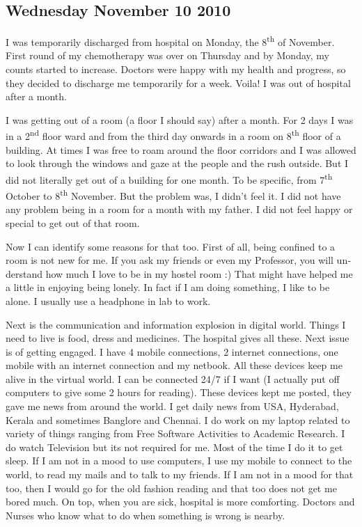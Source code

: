\begin{english}
\vskip 2pt
\subsection*{Wednesday November 10 2010}

I was temporarily discharged from hospital on Monday, the 8\textsuperscript{th} of November. First round of my chemotherapy 
was over on Thursday and by Monday, my counts started to increase. Doctors were happy with my health and 
progress, so they decided to discharge me temporarily for a week. Voila! I was out of hospital after a month. 

I was getting out of a room (a floor I should say) after a month. For 2 days I was in a 2\textsuperscript{nd} floor ward and from 
the third day onwards in a room on 8\textsuperscript{th} floor of a building. At times I was free to roam around the floor corridors 
and I was allowed to look through the windows and gaze at the people and the rush outside. But I did not literally 
get out of a building for one month. To be specific, from 7\textsuperscript{th} October to 8\textsuperscript{th} November. But the problem was, I didn't 
feel it. I did not have any problem being in a room for a month with my father. I did not feel happy or special to 
get out of that room. 

Now I can identify some reasons for that too. First of all, being confined to a room is not new for me. If you ask 
my friends or even my Professor, you will understand how much I love to be in my hostel room :) That might 
have helped me a little in enjoying being lonely. In fact if I am doing something, I like to be alone. I usually use a 
headphone in lab to work.  

Next is the communication and information explosion in digital world. Things I need to live is food, dress and 
medicines. The hospital gives all these. Next issue is of getting engaged. I have 4 mobile connections, 2 internet 
connections, one mobile with an internet connection and my netbook. All these devices keep me alive in the virtual 
world. I can be connected 24/7 if I want (I actually put off computers to give some 2 hours for reading). These 
devices kept me posted, they gave me news from around the world. I get daily news from USA, Hyderabad, Kerala 
and sometimes Banglore and Chennai. I do work on my laptop related to variety of things ranging from Free Software
Activities to Academic Research. I do watch Television but its not required for me. Most of the time I do it to get 
sleep. If I am not in a mood to use computers, I use my mobile to connect to the world, to read my mails and to talk 
to my friends. If I am not in a mood for that too, then I would go for the old fashion reading and that too does not 
get me bored much. On top, when you are sick, hospital is more comforting. Doctors and Nurses who know what 
to do when something is wrong is nearby.


\end{english}
